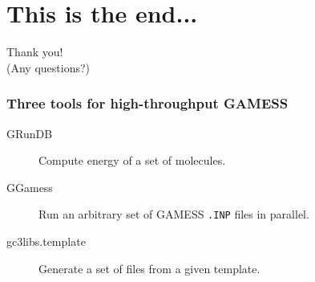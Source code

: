 \documentclass[english,serif,mathserif,xcolor=pdftex,dvipsnames,table]{beamer}
\begin{document}
\section{This is the end...}
\label{sec:end}

\begin{frame}
  \begin{center}
    {\Huge Thank you!}
    \\
    \+
    {\Large (Any questions?)}
  \end{center}
\end{frame}

\begin{frame}
  \frametitle{Three tools for high-throughput GAMESS}

  \begin{description}
  \item[GRunDB] Compute energy of a set of molecules.
  \item[GGamess] Run an arbitrary set of GAMESS \texttt{.INP} files in parallel.
  \item[gc3libs.template] Generate a set of files from a given template.
  \end{description}
\end{frame}
\end{document}
